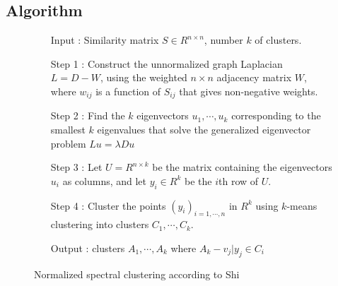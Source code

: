 \subsection{Algorithm}
\begin{figure}[ht]
\begin{mdframed}
\begin{enumerate}
\item[Input] : Similarity matrix $S \in R^{n \times n}$, number $k$ of clusters. \\
\item[Step 1] : Construct the unnormalized graph Laplacian $L = D - W$, using the weighted $n \times n$ adjacency matrix $W$, where $w_{ij}$ is a function of $S_{ij}$ that gives non-negative weights. \\
\item[Step 2] : Find the $k$ eigenvectors $u_1, \cdots, u_k$ corresponding to the smallest $k$ eigenvalues that solve the generalized eigenvector problem $L u = \lambda D u$ \\
\item[Step 3] : Let $U = R^{n \times k}$ be the matrix containing the eigenvectors $u_i$ as columns, and let $y_i \in R^k$ be the $i$th row of $U$.\\
\item[Step 4] : Cluster the points $(y_i)_{i=1,\cdots,n}$ in $R^k$ using $k$-means clustering into clusters $C_1,\cdots,C_k$.\\
\item[Output] : clusters $A_1, \cdots, A_k$ where $A_k - {v_j|y_j \in C_i}$
\end{enumerate}
\end{mdframed}
\caption{Normalized spectral clustering according to Shi}
\end{figure}

